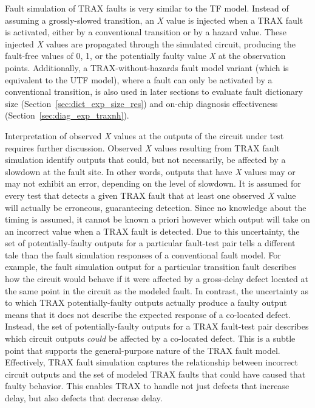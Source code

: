 Fault simulation of TRAX faults is very similar to the TF model.
%
Instead of assuming a grossly-slowed transition, an \textit{X} value is injected when a TRAX fault is activated, either by a conventional transition or by a hazard value.
%
These injected \textit{X} values are propagated through the simulated circuit, producing the fault-free values of 0, 1, or the potentially faulty value \textit{X} at the observation points.
%
Additionally, a TRAX-without-hazards fault model variant (which is equivalent to the UTF model), where a fault can only be activated by a conventional transition, is also used in later sections to evaluate fault dictionary size (Section~\ref{sec:dict_exp_size_res}) and on-chip diagnosis effectiveness (Section~\ref{sec:diag_exp_traxnh}).

Interpretation of observed \textit{X} values at the outputs of the circuit under test requires further discussion.
%
Observed \textit{X} values resulting from TRAX fault simulation identify outputs that could, but not necessarily, be affected by a slowdown at the fault site.
%
In other words, outputs that have \textit{X} values may or may not exhibit an error, depending on the level of slowdown.
%
It is assumed for every test that detects a given TRAX fault that at least one observed \textit{X} value will actually be erroneous, guaranteeing detection.
%
Since no knowledge about the timing is assumed, it cannot be known a priori however which output will take on an incorrect value when a TRAX fault is detected.
%
Due to this uncertainty, the set of potentially-faulty outputs for a particular fault-test pair tells a different tale than the fault simulation responses of a conventional fault model.
%
For example, the fault simulation output for a particular transition fault describes how the circuit would behave if it were affected by a gross-delay defect located at the same point in the circuit as the modeled fault.
%
In contrast, the uncertainty as to which TRAX potentially-faulty outputs actually produce a faulty output means that it does not describe the expected response of a co-located defect.
%
Instead, the set of potentially-faulty outputs for a TRAX fault-test pair describes which circuit outputs \textit{could} be affected by a co-located defect.
%
This is a subtle point that supports the general-purpose nature of the TRAX fault model.
%
Effectively, TRAX fault simulation captures the relationship between incorrect circuit outputs and the set of modeled TRAX faults that could have caused that faulty behavior.
%
This enables TRAX to handle not just defects that increase delay, but also defects that decrease delay.


